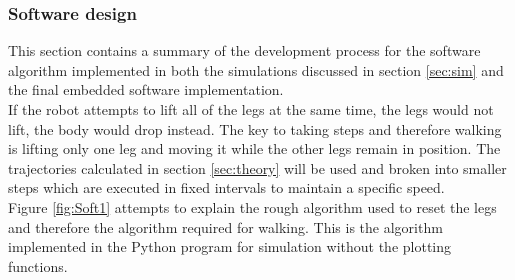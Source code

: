 \subsubsection{Software design}
\label{sec:soft}
This section contains a summary of the development process for the software algorithm implemented in both the simulations discussed in section \ref{sec:sim} and the final embedded software implementation.\\

If the robot attempts to lift all of the legs at the same time, the legs would not lift, the body would drop instead. The key to taking steps and therefore walking is lifting only one leg and moving it while the other legs remain in position. The trajectories calculated in section \ref{sec:theory} will be used and broken into smaller steps which are executed in fixed intervals to maintain a specific speed.\\

Figure \ref{fig:Soft1} attempts to explain the rough algorithm used to reset the legs and therefore the algorithm required for walking. This is the algorithm implemented in the Python program for simulation without the plotting functions.

